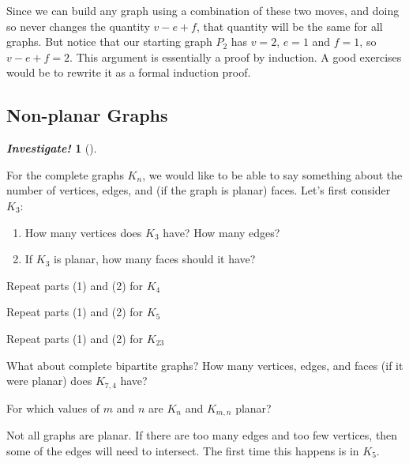 \documentclass[10pt,]{book}
\theoremstyle{plain}
\theoremstyle{definition}
\theoremstyle{definition}
\newtheorem{investigation}[project]{\emph{Investigate!}}
\theoremstyle{definition}
\numberwithin{equation}{chapter}
\newcommand{\vtx}[2]{node[fill,circle,inner sep=0pt, minimum size=4pt,label=#1:#2]{}}
\renewcommand{\v}{\vtx{above}{}}
\begin{document}
Since we can build any graph using a combination of these two moves, and doing so never changes the quantity \(v - e + f\), that quantity will be the same for all graphs. But notice that our starting graph \(P_2\) has \(v = 2\), \(e = 1\) and \(f = 1\), so \(v - e + f = 2\). This argument is essentially a proof by induction. A good exercises would be to rewrite it as a formal induction proof.
%
\typeout{************************************************}
\typeout{************************************************}
\subsection[Non-planar Graphs]{Non-planar Graphs}\label{subsection-37}
\begin{investigation}[]\label{investigation-31}

For the complete graphs \(K_n\), we would like to be able to say something about the number of vertices, edges, and (if the graph is planar) faces. Let's first consider \(K_3\):
\leavevmode%
\begin{enumerate}
\item\hypertarget{li-1212}{}
How many vertices does \(K_3\) have? How many edges?
%
\item\hypertarget{li-1213}{}
If \(K_3\) is planar, how many faces should it have?
%
\end{enumerate}

%
\par

Repeat parts (1) and (2) for \(K_4\)
%
\par

Repeat parts (1) and (2) for \(K_5\)
%
\par

Repeat parts (1) and (2) for \(K_{23}\)
%
\par

What about complete bipartite graphs? How many vertices, edges, and faces (if it were planar) does \(K_{7,4}\) have?
%
\par

For which values of \(m\) and \(n\) are \(K_n\) and \(K_{m,n}\) planar?
%
\end{investigation}

Not all graphs are planar. If there are too many edges and too few vertices, then some of the edges will need to intersect. The first time this happens is in \(K_5\).
%
\leavevmode%
\begin{figure}
\centering
{
}
\end{figure}
\par
\end{document}
